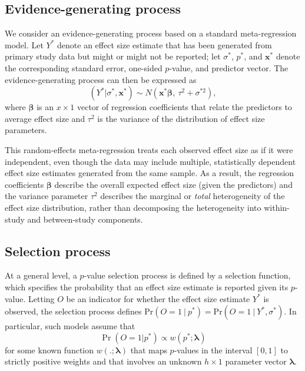 \documentclass[
  man, donotrepeattitle,floatsintext]{apa7}
\begin{document}
\subsection{Evidence-generating process}\label{evidence-generating-process}

We consider an evidence-generating process based on a standard meta-regression model.
Let \(Y^*\) denote an effect size estimate that has been generated from primary study data but might or might not be reported; let \(\sigma^*\), \(p^*\), and \(\mathbf{x}^*\) denote the corresponding standard error, one-sided \(p\)-value, and predictor vector.
The evidence-generating process can then be expressed as
\begin{equation}
\label{eq:meta-mean-regression}
\left(Y^* | \sigma^*, \mathbf{x}^*\right) \sim N\left(\mathbf{x}^* \boldsymbol\beta, \ \tau^2 + \sigma^{*2}\right),
\end{equation}
where \(\boldsymbol\beta\) is an \(x \times 1\) vector of regression coefficients that relate the predictors to average effect size and \(\tau^2\) is the variance of the distribution of effect size parameters.

This random-effects meta-regression treats each observed effect size as if it were independent, even though the data may include multiple, statistically dependent effect size estimates generated from the same sample. As a result, the regression coefficients \(\boldsymbol\beta\) describe the overall expected effect size (given the predictors) and the variance parameter \(\tau^2\) describes the marginal or \emph{total} heterogeneity of the effect size distribution, rather than decomposing the heterogeneity into within-study and between-study components.

\subsection{Selection process}\label{selection-process}

At a general level, a \(p\)-value selection process is defined by a selection function, which specifies the probability that an effect size estimate is reported given its \(p\)-value.
Letting \(O\) be an indicator for whether the effect size estimate \(Y^*\) is observed, the selection process defines \(\text{Pr}(O = 1 \ | \ p^*) = \text{Pr}(O = 1 \ | \ Y^*, \sigma^*)\).
In particular, such models assume that
\begin{equation}
\label{eq:selection-process}
\Pr\left(O = 1 | p^* \right) \propto w\left(p^*; \boldsymbol\lambda \right)
\end{equation}
for some known function \(w\left(.; \boldsymbol\lambda\right)\) that maps \(p\)-values in the interval \([0,1]\) to strictly positive weights and that involves an unknown \(h \times 1\) parameter vector \(\boldsymbol\lambda\).
\end{document}
